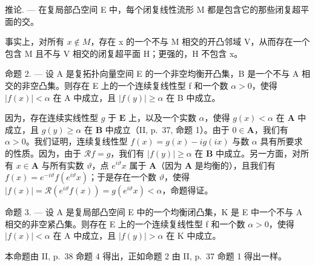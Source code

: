 推论. --- 在复局部凸空间 E 中，每个闭复线性流形 M 都是包含它的那些闭复超平面的交。

事实上，对所有 \(x \notin M\)，存在 x 的一个不与 M 相交的开凸邻域 V，从而存在一个包含 M 且不与 V 相交的闭复超平面 H；更强的，H 不包含 x。

命题 2. --- 设 A 是复拓扑向量空间 E 的一个非空均衡开凸集，B 是一个不与 A 相交的非空凸集。则存在 E 上的一个连续复线性型 f 和一个数 \(\alpha > 0\)，使得 \(|f(x)| < \alpha\) 在 A 中成立，且 \(|f(y)| \geqslant \alpha\) 在 B 中成立。

因为，存在连续实线性型 \(g\) 于 \(\mathbf{E}\) 上，以及一个实数 \(\alpha\)，使得 \(g(x) < \alpha\) 在 \(\mathbf{A}\) 中成立，且 \(g(y) \geqslant \alpha\) 在 \(\mathbf{B}\) 中成立（II, p.~37, 命题 1）。由于 \(0 \in \mathbf{A}\)，我们有 \(\alpha > 0\)。我们证明，连续复线性型 \(f(x) = g(x) - ig(ix)\) 与数 \(\alpha\) 具有所要求的性质。因为，由于 \(\mathcal{R}f = g\)，我们有 \(|f(y)| \geqslant \alpha\) 在 \(\mathbf{B}\) 中成立。另一方面，对所有 \(x \in \mathbf{A}\) 与所有实数 \(\vartheta\)，点 \(e^{i\vartheta}x\) 属于 \(\mathbf{A}\)（因为 \(\mathbf{A}\) 是均衡的），且我们有 \(f(x) = e^{-i\vartheta}f(e^{i\vartheta}x)\)；于是存在一个数 \(\vartheta\)，使得 \(|f(x)| = \mathcal{R}(e^{i\vartheta}f(x)) = g(e^{i\vartheta}x) < \alpha\)，命题得证。

命题 3. --- 设 A 是复局部凸空间 E 中的一个均衡闭凸集，K 是 E 中一个不与 A 相交的非空紧凸集。则存在 E 上的一个连续复线性型 f 和一个数 \(\alpha > 0\)，使得 \(|f(x)| < \alpha\) 在 A 中成立，且 \(|f(y)| > \alpha\) 在 K 中成立。

本命题由 II, p.~38 命题 4 得出，正如命题 2 由 II, p.~37 命题 1 得出一样。

